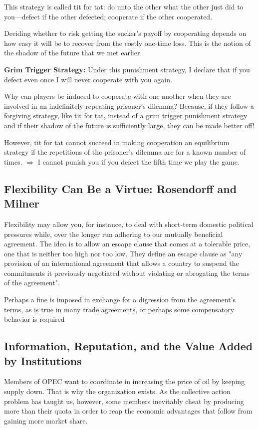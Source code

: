 This strategy is called tit for tat: do unto the other what the other just did to you—defect if the other defected; cooperate if the other cooperated.

Deciding whether to risk getting the sucker’s payoff by cooperating depends on how easy it will be to recover from the costly one-time loss. This is the notion of the shadow of the future that we met earlier.

\textbf{Grim Trigger Strategy:} Under this punishment strategy, I declare that if you defect even once I will never cooperate with you again.

Why can players be induced to cooperate with one another when they are involved in an
indefinitely repeating prisoner’s dilemma? Because, if they follow a forgiving strategy, like tit
for tat, instead of a grim trigger punishment strategy and if their shadow of the future is
sufficiently large, they can be made better off!

However, tit for tat cannot succeed in making cooperation an equilibrium strategy if the repetitions of the prisoner’s dilemma are for a known number of times. $\Rightarrow$ I cannot punish you if you defect the fifth time we
play the game.

\subsection{Flexibility Can Be a Virtue: Rosendorff and Milner}
Flexibility may allow you, for instance, to deal with short-term domestic political pressures while, over the longer run adhering to our mutually beneficial agreement. The idea is to allow an escape clause that comes at a tolerable price, one that is neither too high nor too low. They define an escape clause as "any provision of an international agreement that allows a country to suspend the commitments it previously negotiated without violating or abrogating the terms of the agreement".

Perhaps a fine is imposed in exchange for a digression from the agreement’s terms, as is true in many trade agreements, or perhaps some compensatory behavior is required

\subsection{Information, Reputation, and the Value Added by Institutions}

Members of OPEC want to coordinate in increasing the price of oil by keeping supply down. That is why the organization exists. As the collective action problem has taught us, however, some members inevitably cheat by producing more than their quota in order to reap the economic advantages that follow from gaining more market share.

